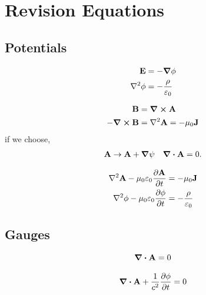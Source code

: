 \documentclass{book}
\begin{document}
{\appendix
\chapter{Revision Equations}
\section{Potentials}
\begin{tcolorbox}[colback=red!5!white,colframe=red!75!black,title=Static Electric Potential]
	\begin{align}
		\vb{E} &= - \grad \phi \\
		\laplacian{\phi} &= - \frac{\rho}{\varepsilon_0}
	\end{align}
\end{tcolorbox}
\begin{tcolorbox}[colback=blue!5!white,colframe=blue!75!black,title=Static Magnetic Potential]
	\begin{align}
		\vb{B} &= \curl{\vb{A}} \\
		-\curl{\vb{B}} &= \laplacian{\vb{A}} = - \mu_0 \vb{J}
	\end{align} 
	if we choose,
	\begin{align}
		\vb{A} \to \vb{A} + \grad{\psi} && \div{\vb{A}} = 0.
	\end{align}
\end{tcolorbox}
\begin{tcolorbox}[colback=green!5!white,colframe=green!75!black,title=Dynamic Potentials]
	\begin{align}
		\laplacian\vb{A} - \mu_0\varepsilon_0 \pdv{\vb{A}}{t} &= - \mu_0 \vb{J} \label{eq:A} \\
		\laplacian\vb{\phi} - \mu_0\varepsilon_0\pdv{\phi}{t} &= -\frac{\rho}{\varepsilon_0} \label{eq:phi}
	\end{align}
\end{tcolorbox}
\section{Gauges}
\begin{tcolorbox}[colback=red!5!white,colframe=red!75!black,title=Coloumb Gauge]
	\begin{equation}
		\div{\vb{A}} = 0
	\end{equation}
\end{tcolorbox}
\begin{tcolorbox}[colback=blue!5!white,colframe=blue!75!black,title=Lorenz Gauge]
	\begin{equation}
		\div{\vb{A}} + \frac{1}{c^2}\pdv{\phi}{t} = 0
	\end{equation}
\end{tcolorbox}
}
\end{document}
